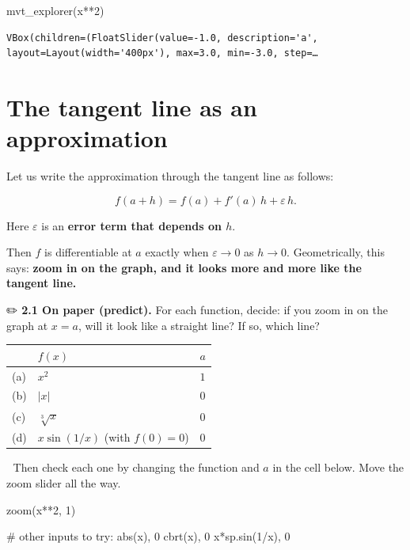 \documentclass[
  letterpaper,
  DIV=11,
  numbers=noendperiod]{scrreprt}
\newenvironment{Shaded}{\begin{snugshade}}{\end{snugshade}}
\newcommand{\CommentTok}[1]{\textcolor[rgb]{0.37,0.37,0.37}{#1}}
\newcommand{\DecValTok}[1]{\textcolor[rgb]{0.68,0.00,0.00}{#1}}
\newcommand{\NormalTok}[1]{\textcolor[rgb]{0.00,0.23,0.31}{#1}}
\newcommand{\OperatorTok}[1]{\textcolor[rgb]{0.37,0.37,0.37}{#1}}
\newcounter{none} %
\theoremstyle{plain}
\theoremstyle{plain}
\theoremstyle{definition}
\theoremstyle{definition}
\theoremstyle{definition}
\theoremstyle{plain}
\theoremstyle{plain}
\theoremstyle{remark}
\begin{document}
\begin{Shaded}
\begin{Highlighting}[]
\NormalTok{mvt\_explorer(x}\OperatorTok{**}\DecValTok{2}\NormalTok{)}
\end{Highlighting}
\end{Shaded}

\begin{verbatim}
VBox(children=(FloatSlider(value=-1.0, description='a', layout=Layout(width='400px'), max=3.0, min=-3.0, step=…
\end{verbatim}

\section{The tangent line as an
approximation}\label{the-tangent-line-as-an-approximation-1}

Let us write the approximation through the tangent line as follows:

\[f(a+h) = f(a) + f'(a)\,h + \varepsilon \, h.\]

Here \(\varepsilon\) is an \textbf{error term that depends on \(h\)}.

Then \(f\) is differentiable at \(a\) exactly when \(\varepsilon\to0\)
as \(h\to0\). Geometrically, this says: \textbf{zoom in on the graph,
and it looks more and more like the tangent line.}

✏️ \textbf{2.1 On paper (predict).} For each function, decide: if you
zoom in on the graph at \(x=a\), will it look like a straight line? If
so, which line?

{\def\LTcaptype{none} %
\begin{longtable}[]{@{}lll@{}}
\toprule\noalign{}
& \(f(x)\) & \(a\) \\
\midrule\noalign{}
\endhead
\bottomrule\noalign{}
\endlastfoot
(a) & \(x^2\) & \(1\) \\
(b) & \(\lvert x\rvert\) & \(0\) \\
(c) & \(\sqrt[3]{x}\) & \(0\) \\
(d) & \(x\sin(1/x)\) (with \(f(0)=0\)) & \(0\) \\
\end{longtable}
}

🔬 Then check each one by changing the function and \(a\) in the cell
below. Move the zoom slider all the way.

\begin{Shaded}
\begin{Highlighting}[]
\NormalTok{zoom(x}\OperatorTok{**}\DecValTok{2}\NormalTok{, }\DecValTok{1}\NormalTok{)}

\CommentTok{\# other inputs to try:   abs(x), 0        cbrt(x), 0        x*sp.sin(1/x), 0}
\end{Highlighting}
\end{Shaded}
\end{document}
